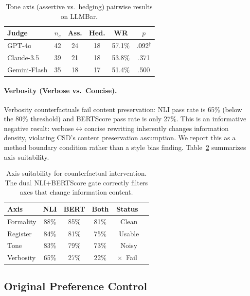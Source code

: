 \documentclass[11pt,a4paper]{article}
\newcommand{\cmark}{\checkmark}
\newcommand{\xmark}{$\times$}
\begin{document}
\begin{table}[t]
\centering
\small
\begin{tabular}{lccccc}
\toprule
\textbf{Judge} & $n_c$ & \textbf{Ass.} & \textbf{Hed.} & \textbf{WR} & \textbf{$p$} \\
\midrule
GPT-4o & 42 & 24 & 18 & 57.1\% & .092$^\dagger$ \\
Claude-3.5 & 39 & 21 & 18 & 53.8\% & .371 \\
Gemini-Flash & 35 & 18 & 17 & 51.4\% & .500 \\
\bottomrule
\end{tabular}
\caption{Tone axis (assertive vs.\ hedging) pairwise results on LLMBar.}
\label{tab:tone}
\end{table}

\paragraph{Verbosity (Verbose vs.\ Concise).}
Verbosity counterfactuals fail content preservation: NLI pass rate is 65\% (below the 80\% threshold) and BERTScore pass rate is only 27\%.
This is an informative negative result: verbose$\leftrightarrow$concise rewriting inherently changes information density, violating CSD's content preservation assumption.
We report this as a method boundary condition rather than a style bias finding.
Table~\ref{tab:axissummary} summarizes axis suitability.

\begin{table}[t]
\centering
\small
\begin{tabular}{lccccc}
\toprule
\textbf{Axis} & \textbf{NLI} & \textbf{BERT} & \textbf{Both} & \textbf{Status} \\
\midrule
Formality & 88\% & 85\% & 81\% & \cmark~Clean \\
Register & 84\% & 81\% & 75\% & \cmark~Usable \\
Tone & 83\% & 79\% & 73\% & \cmark~Noisy \\
Verbosity & 65\% & 27\% & 22\% & \xmark~Fail \\
\bottomrule
\end{tabular}
\caption{Axis suitability for counterfactual intervention. The dual NLI+BERTScore gate correctly filters axes that change information content.}
\label{tab:axissummary}
\end{table}

\label{sec:verbosity}

\subsection{Original Preference Control}
\label{sec:original}
\end{document}
